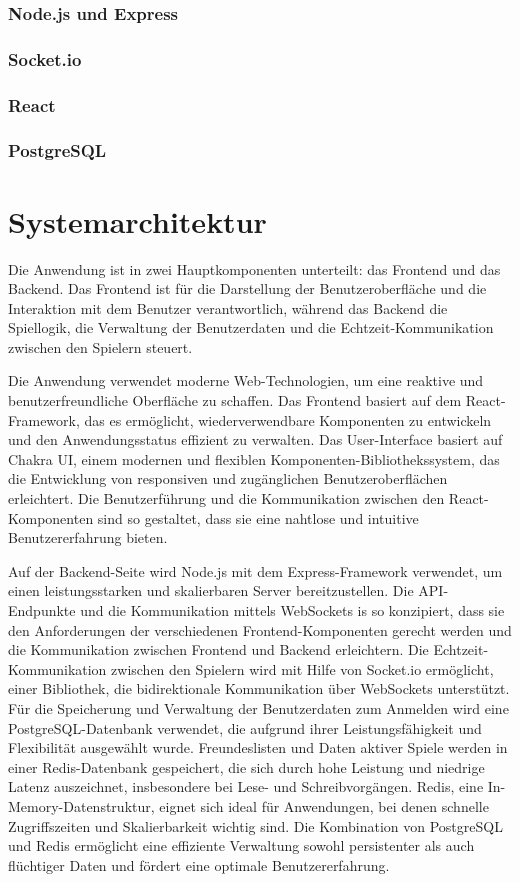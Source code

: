 \documentclass[a4paper,12pt]{report}
\newcommand{\footcite}[1]{\footnotemark\footnotetext{\cite{#1}}}
\begin{document}
        \subsection{Node.js und Express}
        \subsection{Socket.io}
        \subsection{React}
        \subsection{PostgreSQL}

\chapter{Systemarchitektur}
Die Anwendung ist in zwei Hauptkomponenten unterteilt: das Frontend und das Backend. Das Frontend ist für die Darstellung der Benutzeroberfläche und die Interaktion mit dem Benutzer verantwortlich, während das Backend die Spiellogik, die Verwaltung der Benutzerdaten und die Echtzeit-Kommunikation zwischen den Spielern steuert.

Die Anwendung verwendet moderne Web-Technologien, um eine reaktive und benutzerfreundliche Oberfläche zu schaffen. Das Frontend basiert auf dem React-Framework\footcite{react}, das es ermöglicht, wiederverwendbare Komponenten zu entwickeln und den Anwendungsstatus effizient zu verwalten. Das User-Interface basiert auf Chakra UI\footcite{chakraui}, einem modernen und flexiblen Komponenten-Bibliothekssystem, das die Entwicklung von responsiven und zugänglichen Benutzeroberflächen erleichtert. Die Benutzerführung und die Kommunikation zwischen den React-Komponenten sind so gestaltet, dass sie eine nahtlose und intuitive Benutzererfahrung bieten.

Auf der Backend-Seite wird Node.js\footcite{nodejs} mit dem Express-Framework verwendet, um einen leistungsstarken und skalierbaren Server bereitzustellen. Die API-Endpunkte und die Kommunikation mittels WebSockets is so konzipiert, dass sie den Anforderungen der verschiedenen Frontend-Komponenten gerecht werden und die Kommunikation zwischen Frontend und Backend erleichtern. Die Echtzeit-Kommunikation zwischen den Spielern wird mit Hilfe von Socket.io\footcite{socketio} ermöglicht, einer Bibliothek, die bidirektionale Kommunikation über WebSockets unterstützt. Für die Speicherung und Verwaltung der Benutzerdaten zum Anmelden wird eine PostgreSQL\footcite{postgresql}-Datenbank verwendet, die aufgrund ihrer Leistungsfähigkeit und Flexibilität ausgewählt wurde. Freundeslisten und Daten aktiver Spiele werden in einer Redis\footcite{redis}-Datenbank gespeichert, die sich durch hohe Leistung und niedrige Latenz auszeichnet, insbesondere bei Lese- und Schreibvorgängen. Redis, eine In-Memory-Datenstruktur, eignet sich ideal für Anwendungen, bei denen schnelle Zugriffszeiten und Skalierbarkeit wichtig sind. Die Kombination von PostgreSQL und Redis ermöglicht eine effiziente Verwaltung sowohl persistenter als auch flüchtiger Daten und fördert eine optimale Benutzererfahrung.
\end{document}
